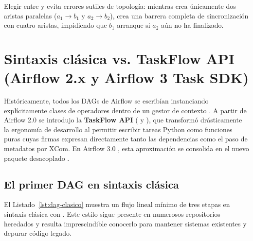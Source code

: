 Elegir entre  y  evita errores sutiles de topología: mientras  crea únicamente dos aristas paralelas ($a_1 \rightarrow b_1$ y $a_2 \rightarrow b_2$),  crea una barrera completa de sincronización con cuatro aristas, impidiendo que $b_1$ arranque si $a_2$ aún no ha finalizado.

\section{Sintaxis clásica vs. TaskFlow API (Airflow 2.x y Airflow 3 Task SDK)}\label{sec:sintaxis-taskflow}

Históricamente, todos los DAGs de Airflow se escribían instanciando explícitamente clases de operadores dentro de un gestor de contexto . A partir de Airflow 2.0 se introdujo la \textbf{TaskFlow API} ( y ), que transformó drásticamente la ergonomía de desarrollo al permitir escribir tareas Python como funciones puras cuyas firmas expresan directamente tanto las dependencias como el paso de metadatos por XCom. En Airflow 3.0 , esta aproximación se consolida en el nuevo paquete desacoplado .

\subsection{El primer DAG en sintaxis clásica}

El Listado~\ref{lst:dag-clasico} muestra un flujo lineal mínimo de tres etapas en sintaxis clásica con . Este estilo sigue presente en numerosos repositorios heredados y resulta imprescindible conocerlo para mantener sistemas existentes y depurar código legado.

